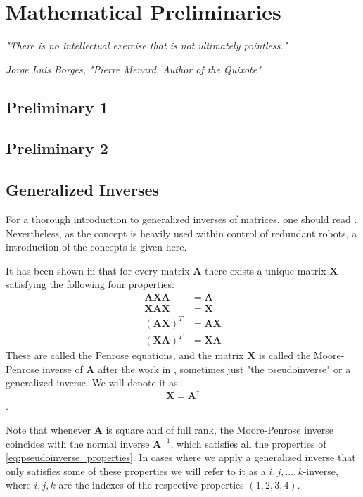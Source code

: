 \documentclass[../main.tex]{subfiles}
\begin{document}
\chapter{Mathematical Preliminaries}
\epigraph{\textit{"There is no intellectual exercise that is not ultimately pointless."}}{\textit{Jorge Luis Borges, "Pierre Menard, Author of the Quixote"}}

\section{Preliminary 1}
\section{Preliminary 2}


\section{Generalized Inverses}
For a thorough introduction to generalized inverses of matrices, one should read \cite{ben-israel2003}. Nevertheless, as the concept is heavily used within control of redundant robots, a introduction of the concepts is given here.

It has been shown in \cite{penrose1955} that for every matrix $\bm{A}$ there exists a unique matrix $\bm{X}$ satisfying the following four properties:
\begin{subequations}
    \label{eq:pseudoinverse_properties}
\begin{align}
        \bm{A}\bm{X}\bm{A} &= \bm{A} \\
        \bm{X}\bm{A}\bm{X} &= \bm{X} \\
        (\bm{A}\bm{X})^T &= \bm{A}\bm{X} \\
        (\bm{X}\bm{A})^T &= \bm{X}\bm{A}
\end{align}
\end{subequations}
These are called the Penrose equations, and the matrix $\bm{X}$ is called the Moore-Penrose inverse of $\bm{A}$ after the work in \cite{moore1920,penrose1955}, sometimes just "the pseudoinverse" or a generalized inverse. We will denote it as
\begin{equation}
    \bm{X} = \bm{A}^{\dagger}
\end{equation}.

Note that whenever $\bm{A}$ is square and of full rank, the Moore-Penrose inverse coincides with the normal inverse $\bm{A}^{-1}$, which satisfies all the properties of \cref{eq:pseudoinverse_properties}. In cases where we apply a generalized inverse that only satisfies some of these properties we will refer to it as a ${i,j, ..., k}$-inverse, where $i, j, k$ are the indexes of the respective properties $(1,2,3,4)$.
\end{document}
